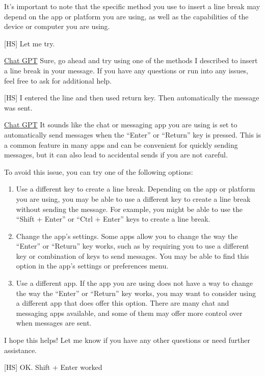 \documentclass[
]{book}
\providecommand{\tightlist}{%
  \setlength{\itemsep}{0pt}\setlength{\parskip}{0pt}}
\theoremstyle{definition}
\theoremstyle{definition}
\theoremstyle{definition}
\theoremstyle{definition}
\theoremstyle{remark}
\begin{document}
It's important to note that the specific method you use to insert a line break may depend on the app or platform you are using, as well as the capabilities of the device or computer you are using.

{[}HS{]} Let me try.

\protect\hyperlink{chatgpt}{Chat GPT} Sure, go ahead and try using one of the methods I described to insert a line break in your message. If you have any questions or run into any issues, feel free to ask for additional help.

{[}HS{]} I entered the line and then used return key. Then automatically the message was sent.

\protect\hyperlink{chatgpt}{Chat GPT} It sounds like the chat or messaging app you are using is set to automatically send messages when the ``Enter'' or ``Return'' key is pressed. This is a common feature in many apps and can be convenient for quickly sending messages, but it can also lead to accidental sends if you are not careful.

To avoid this issue, you can try one of the following options:

\begin{enumerate}
\def\labelenumi{\arabic{enumi}.}
\tightlist
\item
  Use a different key to create a line break. Depending on the app or platform you are using, you may be able to use a different key to create a line break without sending the message. For example, you might be able to use the ``Shift + Enter'' or ``Ctrl + Enter'' keys to create a line break.
\item
  Change the app's settings. Some apps allow you to change the way the ``Enter'' or ``Return'' key works, such as by requiring you to use a different key or combination of keys to send messages. You may be able to find this option in the app's settings or preferences menu.
\item
  Use a different app. If the app you are using does not have a way to change the way the ``Enter'' or ``Return'' key works, you may want to consider using a different app that does offer this option. There are many chat and messaging apps available, and some of them may offer more control over when messages are sent.
\end{enumerate}

I hope this helps! Let me know if you have any other questions or need further assistance.

{[}HS{]} OK. Shift + Enter worked
\end{document}
